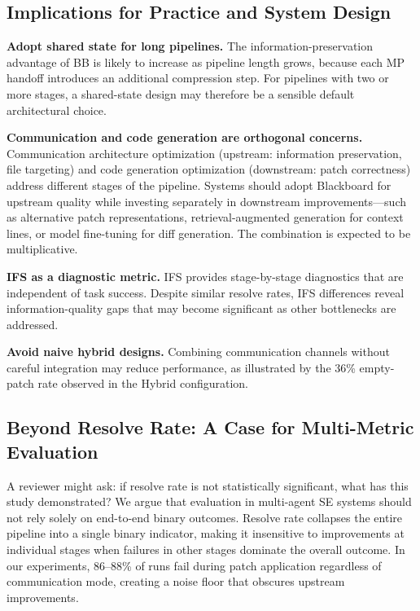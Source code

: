 \documentclass{ieeeaccess}
\begin{document}
\subsection{Implications for Practice and System Design}

\textbf{Adopt shared state for long pipelines.} The information-preservation advantage of BB is likely to increase as pipeline length grows, because each MP handoff introduces an additional compression step. For pipelines with two or more stages, a shared-state design may therefore be a sensible default architectural choice.

\textbf{Communication and code generation are orthogonal concerns.} Communication architecture optimization (upstream: information preservation, file targeting) and code generation optimization (downstream: patch correctness) address different stages of the pipeline. Systems should adopt Blackboard for upstream quality while investing separately in downstream improvements---such as alternative patch representations, retrieval-augmented generation \cite{lewis2020retrieval} for context lines, or model fine-tuning for diff generation. The combination is expected to be multiplicative.

\textbf{IFS as a diagnostic metric.} IFS provides stage-by-stage diagnostics that are independent of task success. Despite similar resolve rates, IFS differences reveal information-quality gaps that may become significant as other bottlenecks are addressed.

\textbf{Avoid naive hybrid designs.} Combining communication channels without careful integration may reduce performance, as illustrated by the 36\% empty-patch rate observed in the Hybrid configuration.

\subsection{Beyond Resolve Rate: A Case for Multi-Metric Evaluation}

A reviewer might ask: if resolve rate is not statistically significant, what has this study demonstrated? We argue that evaluation in multi-agent SE systems should not rely solely on end-to-end binary outcomes. Resolve rate collapses the entire pipeline into a single binary indicator, making it insensitive to improvements at individual stages when failures in other stages dominate the overall outcome. In our experiments, 86--88\% of runs fail during patch application regardless of communication mode, creating a noise floor that obscures upstream improvements.
\end{document}
